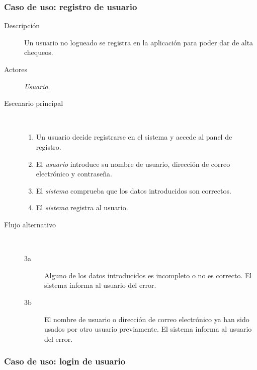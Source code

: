 \subsubsection{Caso de uso: registro de usuario}

\begin{description}
\item[Descripción] Un usuario no logueado se registra en la aplicación para poder dar de alta chequeos.
\item[Actores] \textit{Usuario}.
\item[Escenario principal] $\quad$
  \begin{enumerate}
  \item Un usuario decide registrarse en el sistema y accede al panel de registro.
  \item El \textit{usuario} introduce su nombre de usuario, dirección de correo electrónico y contraseña.
  \item El \textit{sistema} comprueba que los datos introducidos son correctos.
  \item El \textit{sistema} registra al usuario.
  \end{enumerate}
\item[Flujo alternativo] $\quad$
  \begin{description}
  \item[3a] Alguno de los datos introducidos es incompleto o no es correcto. El
    sistema informa al usuario del error.
  \item[3b] El nombre de usuario o dirección de correo electrónico ya han sido
    usados por otro usuario previamente. El sistema informa al usuario del error.
  \end{description}
\end{description}

\subsubsection{Caso de uso: login de usuario}


